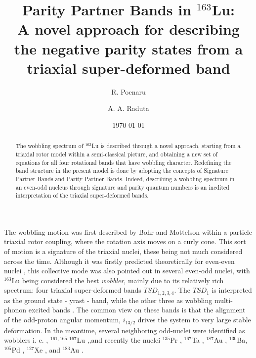 \documentclass[twocolumn,article,amsmath,amssymb,floatfix,aps]{revtex4}
\begin{document}
\title{Parity Partner Bands in $^{163}$Lu: \\ A novel approach for describing the negative parity states from a triaxial super-deformed band}%

\author{R.  Poenaru}%
\author{A.  A.  Raduta}%
%
%

\date{\today}

\begin{abstract}
 The wobbling spectrum of $^{163}$Lu is described through a novel approach, starting from a triaxial rotor model within a semi-classical picture, and obtaining a new set of equations for all four rotational bands that have wobbling character.  Redefining the band structure in the present model is done by adopting the concepts of Signature Partner Bands and Parity Partner Bands.  Indeed, describing a wobbling spectrum in an even-odd nucleus through signature and parity quantum numbers is an inedited interpretation of the triaxial super-deformed  bands. 

\end{abstract}

\maketitle


 The wobbling motion was first described by Bohr and Mottelson within a particle triaxial rotor coupling, where the rotation axis moves on a curly cone.  This sort of motion is a signature of the triaxial nuclei, these being not much considered across the time. 
Although it was firstly predicted theoretically for even-even nuclei \cite{BMott}, this collective mode was also pointed out in several even-odd nuclei, with $^{163}$Lu being considered the best \emph{wobbler}, mainly due to its relatively rich spectrum: four triaxial super-deformed bands $TSD_{1,2,3,4}$.   The $TSD_1$ is interpreted as the ground state - yrast - band, while the other three as  wobbling multi-phonon excited bands \cite{odegaard2001evidence,Jens}. The common view on these bands is that the alignment of the odd-proton angular momentum, $i_{13/2}$ drives the system  to very large stable deformation.  In the meantime, several neighboring odd-nuclei were identified as wobblers i. e. , $^{161,165,167}$Lu \cite{Jens,Scho,Amro,Hage,Bring,Hage1},,and recently the nuclei $^{135}$Pr \cite{Matta,Sen}, $^{167}$Ta \cite{Bring,Hart}, $^{187}$Au \cite{Sen1}, $^{130}$Ba\cite{Chen}, $^{105}$Pd \cite{Timar}, 
$^{127}$Xe \cite{Chakr}, and $^{183}$Au \cite{Nand}. 
\end{document}
